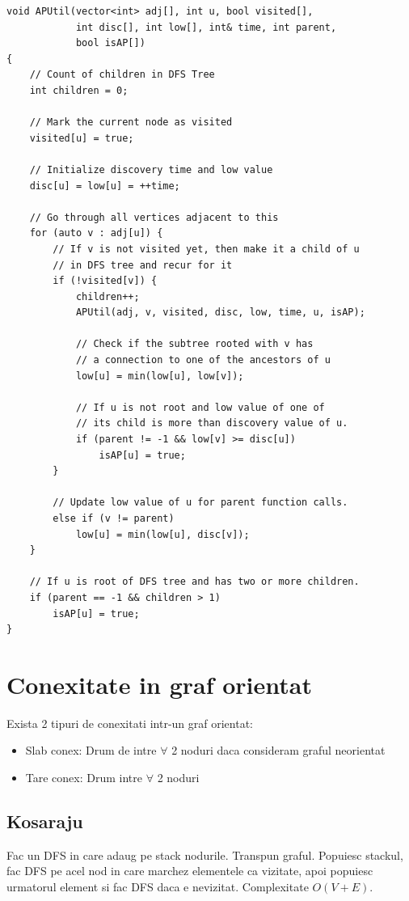 \documentclass{article}
\begin{document}
\begin{lstlisting}
void APUtil(vector<int> adj[], int u, bool visited[],
            int disc[], int low[], int& time, int parent,
            bool isAP[])
{
    // Count of children in DFS Tree
    int children = 0;
 
    // Mark the current node as visited
    visited[u] = true;
 
    // Initialize discovery time and low value
    disc[u] = low[u] = ++time;
 
    // Go through all vertices adjacent to this
    for (auto v : adj[u]) {
        // If v is not visited yet, then make it a child of u
        // in DFS tree and recur for it
        if (!visited[v]) {
            children++;
            APUtil(adj, v, visited, disc, low, time, u, isAP);
 
            // Check if the subtree rooted with v has
            // a connection to one of the ancestors of u
            low[u] = min(low[u], low[v]);
 
            // If u is not root and low value of one of
            // its child is more than discovery value of u.
            if (parent != -1 && low[v] >= disc[u])
                isAP[u] = true;
        }
 
        // Update low value of u for parent function calls.
        else if (v != parent)
            low[u] = min(low[u], disc[v]);
    }
 
    // If u is root of DFS tree and has two or more children.
    if (parent == -1 && children > 1)
        isAP[u] = true;
}
    \end{lstlisting}

\section{Conexitate in graf orientat} Exista 2 tipuri de conexitati intr-un graf orientat:
\begin{itemize}
    \item Slab conex: Drum de intre $\forall$ 2 noduri daca consideram graful neorientat
    \item Tare conex: Drum intre $\forall$ 2 noduri
\end{itemize}

\subsection*{Kosaraju} Fac un DFS in care adaug pe stack nodurile. Transpun graful. Popuiesc stackul, fac DFS pe acel nod in care marchez elementele ca vizitate, apoi popuiesc urmatorul element si fac DFS daca e nevizitat. Complexitate $O(V+E)$.
\end{document}
